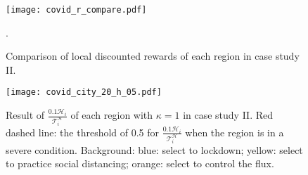 \documentclass[conf]{new-aiaa}
\begin{document}
\begin{figure}[H]
\centering
\texttt{[image: covid\_r\_compare.pdf]}
\caption{Comparison of local discounted rewards of each region in case study II.}.
\label{covid_r_compare}
\end{figure}


\begin{figure}[H]
\centering
\texttt{[image: covid\_city\_20\_h\_05.pdf]}
\caption{Result of $\frac{0.1\mathcal{H}_i}{\mathcal{T}_i^\mathcal{H}}$ of each region with $\kappa = 1$ in case study II. Red dashed line: the threshold of 0.5 for  $\frac{0.1\mathcal{H}_i}{\mathcal{T}_i^\mathcal{H}}$ when the region is in a severe condition. Background: blue: select to lockdown; yellow: select to practice social distancing; orange: select to control the flux.}
\label{covid_city_h}
\end{figure}
\end{document}
